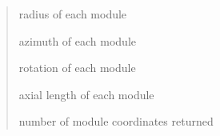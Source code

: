 \documentclass[letterpaper,10pt,english]{sphinxmanual}
\begin{document}
\begin{fulllineitems}
\begin{quote}
\begin{description}
\begin{itemize}
\end{itemize}

\item[{Returns}] \leavevmode

\begin{DUlineblock}{0em}
\item[]         radius of each module
\item[]         azimuth of each module
\item[]         rotation of each module
\item[]         axial length of each module
\item[]       number of module coordinates returned
\end{DUlineblock}


\end{description}\end{quote}

\end{fulllineitems}

\end{document}
